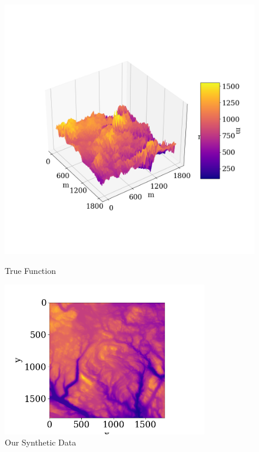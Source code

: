 \documentclass[twoside,11pt]{report}
\begin{document}
\begin{figure}[!h]
\begin{minipage}[!t]{.48\linewidth}
    \begin{center}
        \includegraphics[width=1.0\textwidth]{../runsAndAdditions/realdata3D.png}
        \caption{True Function}\label{fig:realdata3D}
\end{center}
\end{minipage}
\hspace{2mm}
\begin{minipage}[!t]{.48\linewidth}
    \begin{center}
        \includegraphics[width=0.8\textwidth]{../runsAndAdditions/realdataMap.png}
        \caption{Our Synthetic Data}\label{fig:realdataMap}
    \end{center}
\end{minipage}
\end{figure}
\end{document}
